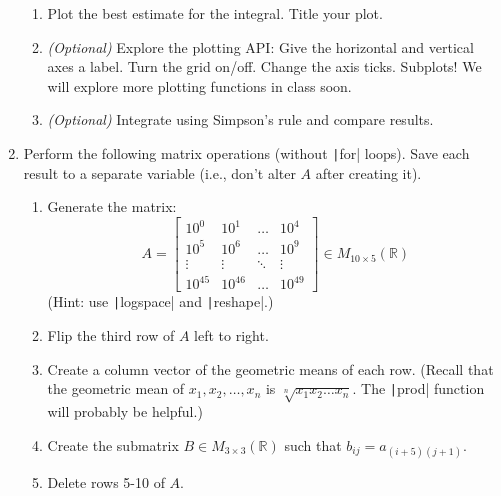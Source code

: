 \documentclass{article}
\begin{document}
\begin{enumerate}
\begin{enumerate}
  \item Plot the best estimate for the integral. Title your plot.
    
  \item \textit{(Optional)} Explore the plotting API: Give the horizontal and vertical axes a label. Turn the grid on/off. Change the axis ticks. Subplots! We will explore more plotting functions in class soon.
    
  \item \textit{(Optional)} Integrate using Simpson's rule and compare results.
  \end{enumerate}
  
  \clearpage
\item Perform the following matrix operations (without \texttt|for| loops). Save each result to a separate variable (i.e., don't alter $A$ after creating it).
  \begin{enumerate}
  \item Generate the matrix:
    \begin{equation*}
      A=\begin{bmatrix}
        10^{0} & 10^{1} & \dots & 10^{4} \\
        10^{5} & 10^6 & \dots & 10^9 \\
        \vdots & \vdots & \ddots & \vdots \\
        10^{45} & 10^{46} & \dots & 10^{49}
      \end{bmatrix}\in M_{10\times 5}(\mathbb{R})
    \end{equation*}
    (Hint: use \texttt|logspace| and \texttt|reshape|.)
    
  \item Flip the third row of $A$ left to right.
    
  \item Create a column vector of the geometric means of each row. (Recall that the geometric mean of $x_1,x_2,\dots,x_n$ is $\sqrt[n]{x_1x_2\dots x_n}$. The \texttt|prod| function will probably be helpful.)
    
  \item Create the submatrix $B\in M_{3\times 3}(\mathbb{R})$ such that $b_{ij}=a_{(i+5)(j+1)}$.
    
  \item Delete rows 5-10 of $A$.
  \end{enumerate}


\end{enumerate}
\end{document}
